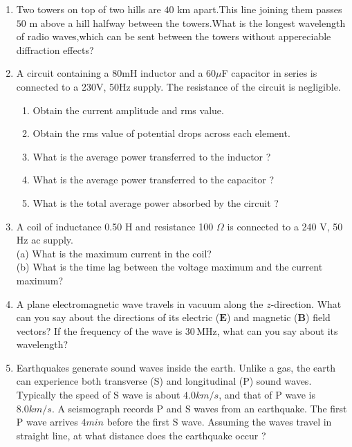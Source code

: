 \begin{enumerate}[label=\thesection.\arabic*,ref=\thesection.\theenumi]
\solution
\pagebreak
\item  Two towers on top of two hills are $40$ km apart.This line joining them passes $50$ m above a hill halfway between the towers.What is the longest wavelength of radio waves,which can be sent between the towers without  appereciable diffraction effects?\\
\solution
\pagebreak
\item A circuit containing a 80mH inductor and a 60$\mu$F capacitor in series is connected to a 230V, 50Hz supply. The resistance of the circuit is negligible.\\
\begin{enumerate}
  \item Obtain the current amplitude and rms value.
  \item Obtain the rms value of potential drops across each element.
  \item What is the average power transferred to the inductor ?
  \item What is the average power transferred to the capacitor ?
  \item What is the total average power absorbed by the circuit ? 
\end{enumerate}
\solution
\pagebreak
\item A coil of inductance 0.50 H and resistance 100 $\Omega$ is connected to a 240 V, 50 Hz ac supply.\\
(a) What is the maximum current in the coil?\\		
(b) What is the time lag between the voltage maximum and the current maximum?\\
\solution
\pagebreak

\item A plane electromagnetic wave travels in vacuum along the \(z\)-direction. What can you say about the directions of its electric (\(\mathbf{E}\)) and magnetic (\(\mathbf{B}\)) field vectors? If the frequency of the wave is \(30 \, \text{MHz}\), what can you say about its wavelength?\\
\solution
\pagebreak

\item
Earthquakes generate sound waves inside the earth. Unlike a gas, the earth can experience both transverse (S) and longitudinal (P) sound waves. Typically the speed of S wave is about $4.0 km/s$, and that of P wave is $8.0 km/s$. A seismograph records P and S waves from an earthquake. The first P wave arrives $4 min$ before the first S wave. Assuming the waves travel in straight line, at what distance does the
earthquake occur ?
\solution
\pagebreak


\end{enumerate}
